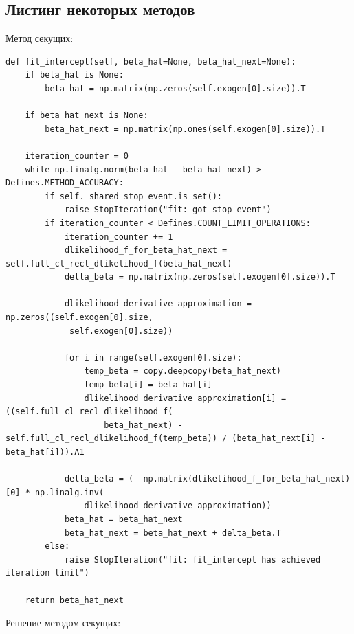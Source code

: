 \documentclass[a4paper,14pt]{extarticle}
\begin{document}
\subsection*{Листинг некоторых методов}
Метод секущих:
\begin{Verbatim}[fontsize=\scriptsize]
def fit_intercept(self, beta_hat=None, beta_hat_next=None):
    if beta_hat is None:
        beta_hat = np.matrix(np.zeros(self.exogen[0].size)).T

    if beta_hat_next is None:
        beta_hat_next = np.matrix(np.ones(self.exogen[0].size)).T

    iteration_counter = 0
    while np.linalg.norm(beta_hat - beta_hat_next) > Defines.METHOD_ACCURACY:
        if self._shared_stop_event.is_set():
            raise StopIteration("fit: got stop event")
        if iteration_counter < Defines.COUNT_LIMIT_OPERATIONS:
            iteration_counter += 1
            dlikelihood_f_for_beta_hat_next = self.full_cl_recl_dlikelihood_f(beta_hat_next)
            delta_beta = np.matrix(np.zeros(self.exogen[0].size)).T

            dlikelihood_derivative_approximation = np.zeros((self.exogen[0].size,
             self.exogen[0].size))

            for i in range(self.exogen[0].size):
                temp_beta = copy.deepcopy(beta_hat_next)
                temp_beta[i] = beta_hat[i]
                dlikelihood_derivative_approximation[i] = ((self.full_cl_recl_dlikelihood_f(
                    beta_hat_next) - self.full_cl_recl_dlikelihood_f(temp_beta)) / (beta_hat_next[i] - beta_hat[i])).A1

            delta_beta = (- np.matrix(dlikelihood_f_for_beta_hat_next)[0] * np.linalg.inv(
                dlikelihood_derivative_approximation))
            beta_hat = beta_hat_next
            beta_hat_next = beta_hat_next + delta_beta.T
        else:
            raise StopIteration("fit: fit_intercept has achieved iteration limit")

    return beta_hat_next
\end{Verbatim}
Решение методом секущих:
\end{document}
